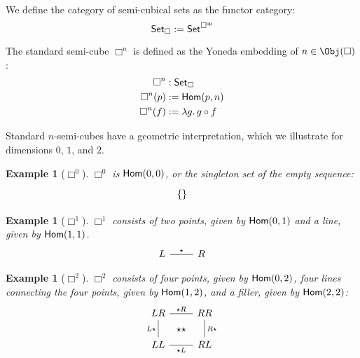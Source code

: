 \documentclass{msc}
\newcommand{\Cube}{\ensuremath{\boldsymbol{{\Box}}}}
\newcommand{\CSet}{\ensuremath{\mathsf{Set}_{\boldsymbol{\Box}}}}
\newtheorem{example}[therm]{Example}
\newcommand{\kstar}{{\star}}
\begin{document}
\begin{definition}[\CSet]
  We define the category of semi-cubical sets as the functor category:
  \begin{equation*}
    \CSet := \Set^{\op{\Cube}}
  \end{equation*}
\end{definition}

\begin{definition}[$\Cube^n$]
  The standard semi-cube $\Cube^n$ is defined as the Yoneda embedding of $n \in \Obj(\Cube)$:
  \begin{align*}
    \Cube^n    & : \CSet                    \\
    \Cube^n(p) & := \Hom(p, n)              \\
    \Cube^n(f) & := \lambda g .\, g \circ f
  \end{align*}
\end{definition}

Standard $n$-semi-cubes have a geometric interpretation, which we illustrate for dimensions $0$, $1$, and $2$.

\begin{example}[$\Cube^0$]
  $\Cube^0$ is $\mathsf{Hom}(0, 0)$, or the singleton set of the empty sequence:
  \begin{equation*}
    \begin{tikzcd}
      \{\}
    \end{tikzcd}
  \end{equation*}
\end{example}

\begin{example}[$\Cube^1$]
  $\Cube^1$ consists of two points, given by $\mathsf{Hom}(0, 1)$ and a line, given by $\mathsf{Hom}(1, 1)$.
  \begin{equation*}
    \begin{tikzcd}
      L \arrow[r, "\kstar", dash] & R
    \end{tikzcd}
  \end{equation*}
\end{example}

\begin{example}[$\Cube^2$]
  $\Cube^2$ consists of four points, given by $\mathsf{Hom}(0, 2)$, four lines connecting the four points, given by $\mathsf{Hom}(1, 2)$, and a filler, given by $\mathsf{Hom}(2, 2)$:
  \begin{equation*}
    \begin{tikzcd}
      LR \arrow[r, dash, "\kstar R"{name=F}] \arrow[d, dash, "L\kstar" left] & RR \arrow[d, dash, "R\kstar"] \\
      LL \arrow[r, dash, "\kstar L"{name=T, below}] & RL \\
      \arrow[rightarrow, from=F, to=T, phantom, "\kstar\kstar" description]
    \end{tikzcd}
  \end{equation*}
\end{example}
\end{document}
